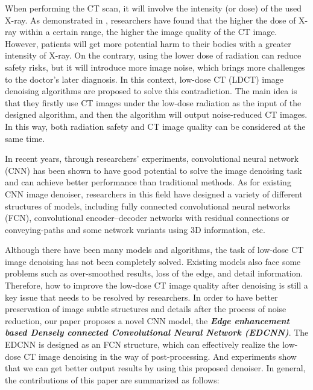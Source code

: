 \documentclass[conference]{IEEEtran}
\begin{document}
        When performing the CT scan, it will involve the intensity (or dose) of the used X-ray\cite{PMID:18046031}. 
        As demonstrated in \cite{naidich_low-dose_1990}, researchers have found that the higher the dose of X-ray within a certain range, the higher the image quality of the CT image. 
        However, patients will get more potential harm to their bodies with a greater intensity of X-ray. 
        On the contrary, using the lower dose of radiation can reduce safety risks, but it will introduce more image noise, which brings more challenges to the doctor’s later diagnosis.
        In this context, low-dose CT (LDCT) image denoising algorithms are proposed to solve this contradiction. 
        The main idea\cite{kang_deep_2017}\cite{Chen_2017} is that they firstly use CT images under the low-dose radiation as the input of the designed algorithm, and then the algorithm will output noise-reduced CT images. 
        In this way, both radiation safety and CT image quality can be considered at the same time.

        In recent years, through researchers' experiments\cite{kang_deep_2017}\cite{Chen:17}, convolutional neural network (CNN) has been shown to have good potential to solve the image denoising task and can achieve better performance than traditional methods.
        As for existing CNN image denoiser, researchers in this field have designed a variety of different structures of models, including fully connected convolutional neural networks (FCN)\cite{Chen:17,Yang_2018,choi_real-time_2018}, convolutional encoder–decoder networks with residual connections\cite{Chen_2017}\cite{hu_artifact_2019} or conveying-paths\cite{Shan_2018,yi_sharpness-aware_2018,gholizadeh-ansari_deep_2020} and some network variants using 3D information\cite{Shan_2018}\cite{7934380}, etc.
        
        Although there have been many models and algorithms, the task of low-dose CT image denoising has not been completely solved. 
        Existing models also face some problems such as over-smoothed results, loss of the edge, and detail information.
        Therefore, how to improve the low-dose CT image quality after denoising is still a key issue that needs to be resolved by researchers.
        In order to have better preservation of image subtle structures and details after the process of noise reduction, our paper proposes a novel CNN model, the \textbf{\emph{Edge enhancement based Densely connected Convolutional Neural Network (EDCNN)}}. 
        The EDCNN is designed as an FCN structure, which can effectively realize the low-dose CT image denoising in the way of post-processing.
        And experiments show that we can get better output results by using this proposed denoiser. 
        In general, the contributions of this paper are summarized as follows:
        
\end{document}
